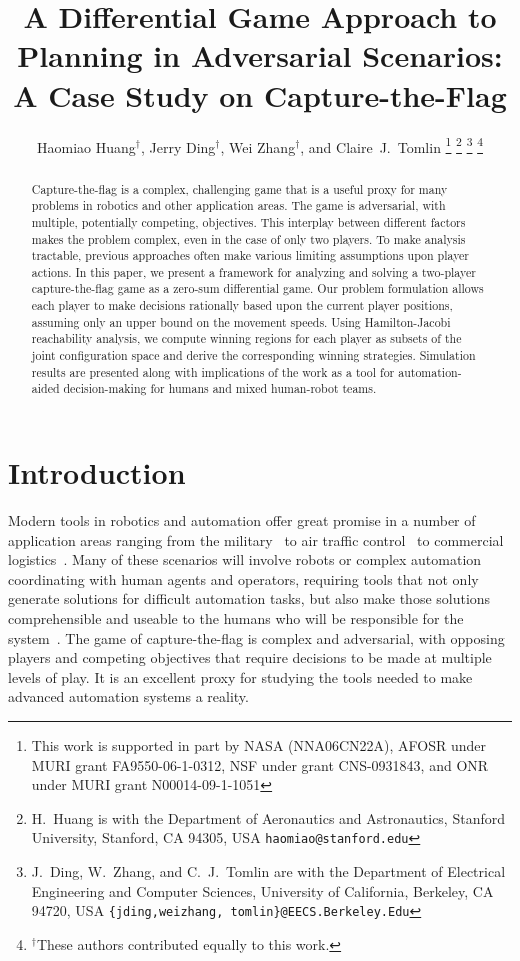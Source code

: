 \documentclass[letterpaper, 10 pt, conference]{ieeeconf}  %
\title{\LARGE \bf
A Differential Game Approach to Planning in Adversarial Scenarios: A Case Study on Capture-the-Flag
}
\author{Haomiao Huang$^\dagger$, Jerry Ding$^\dagger$, Wei Zhang$^\dagger$, and Claire~J.~Tomlin%
\thanks{This work is supported in part by NASA (NNA06CN22A), AFOSR under
MURI grant FA9550-06-1-0312, NSF under grant CNS-0931843, and ONR under MURI grant N00014-09-1-1051}%
\thanks{H.~Huang is with the Department of Aeronautics and Astronautics,
        Stanford University, Stanford, CA 94305, USA
        {\tt\small haomiao@stanford.edu}}                
\thanks{J.~Ding, W.~Zhang, and C.~J.~Tomlin are with the Department of Electrical Engineering and Computer Sciences,
        University of California, Berkeley, CA 94720, USA
        {\tt\small \{jding,weizhang, tomlin\}@EECS.Berkeley.Edu}}
\thanks{$^\dagger$These authors contributed equally to this work.}%
}
\numberwithin{algorithm}{section}
\begin{document}
\maketitle
\thispagestyle{empty}
\pagestyle{empty}


\begin{abstract}
Capture-the-flag is a complex, challenging game that is a useful proxy for many problems in robotics and other application areas. The game is adversarial, with multiple, potentially competing, objectives. This interplay between different factors makes the problem complex, even in the case of only two players. To make analysis tractable, previous approaches often make various limiting assumptions upon player actions. In this paper, we present a framework for analyzing and solving a two-player capture-the-flag game as a zero-sum differential game. Our problem formulation allows each player to make decisions rationally based upon the current player positions, assuming only an upper bound on the movement speeds. Using Hamilton-Jacobi reachability analysis, we compute winning regions for each player as subsets of the joint configuration space and derive the corresponding winning strategies. Simulation results are presented along with implications of the work as a tool for automation-aided decision-making for humans and mixed human-robot teams.

\end{abstract}

\section{Introduction}
\label{sec:intro}

Modern tools in robotics and automation offer great promise in a number of application areas ranging from the military~\cite{OFTHEAIRFORCEWASHINGTON:2009p37} to air traffic control~\cite{Erzberger:2006p44} to commercial logistics~\cite{kiva2009}. Many of these scenarios will involve robots or complex automation coordinating with human agents and operators, requiring tools that not only generate solutions for difficult automation tasks, but also make those solutions comprehensible and useable to the humans who will be responsible for the system~\cite{Axe:2007p9,Metzger:2001p60}. The game of capture-the-flag is complex and adversarial, with opposing players and competing objectives that require decisions to be made at multiple levels of play. It is an excellent proxy for studying the tools needed to make advanced automation systems a reality. 
\end{document}
